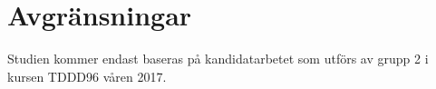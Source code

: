 \section{Avgränsningar}
\label{sec:delimitations}

Studien kommer endast baseras på kandidatarbetet som utförs av
grupp 2 i kursen TDDD96 våren 2017.





